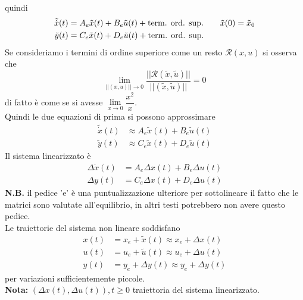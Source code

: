 \documentclass{article}
\numberwithin{equation}{subsection}
\begin{document}
quindi
\begin{align*}
    \tilde{\dot x}(t) &= A_e \tilde{x}(t) + B_e \tilde{u}(t) + \T{term. ord. sup.} \tag*{$\tilde{x}(0) = \tilde{x}_0$}\\
    \tilde{y}(t) &= C_e \tilde{x}(t) + D_e\tilde{u}(t) + \T{term. ord. sup.}
\end{align*}
Se consideriamo i termini di ordine superiore come un resto $\mathcal{R}(x,u)$ si osserva che
\begin{equation}
    \lim_{||(x,u)||\rightarrow 0} \frac{||\mathcal{R}(\tilde{x},\tilde{u})||}{||(\tilde{x},\tilde{u})||} = 0
\end{equation}
di fatto è come se si avesse $\lim\limits_{x \rightarrow 0}\dfrac{x^2}{x}$.\\
Quindi le due equazioni di prima si possono approssimare
\begin{align*}
    \tilde{\dot x}(t) &\approx A_e \tilde{x}(t) + B_e \tilde{u}(t)\\
    \tilde{y}(t) &\approx C_e \tilde{x}(t) + D_e\tilde{u}(t) 
\end{align*}
Il sistema linearizzato è
\begin{align*}
    \Delta \dot x(t) &= A_e \Delta x(t) + B_e \Delta u(t)\\
    \Delta y(t) &= C_e \Delta x(t) + D_e \Delta u(t)
\end{align*}
\textbf{N.B.} il pedice 'e' è una puntualizzazione ulteriore per sottolineare il fatto che le matrici sono valutate all'equilibrio, in altri testi potrebbero non avere questo pedice.
\vspace*{0.2cm}\\
Le traiettorie del sistema non lineare soddisfano
\begin{align*}
    x(t) &= x_e + \tilde{x}(t) \approx x_e + \Delta x(t)\\
    u(t) &= u_e + \tilde{u}(t) \approx u_e + \Delta u(t)\\
    y(t) &= y_e + \Delta y(t) \approx y_e + \Delta y(t) 
\end{align*}
per variazioni sufficientemente piccole.
\vspace*{0.1cm}\\
\textbf{Nota:} $(\Delta x(t),\Delta u(t)), t \geq 0$ traiettoria del sistema linearizzato.
\end{document}
